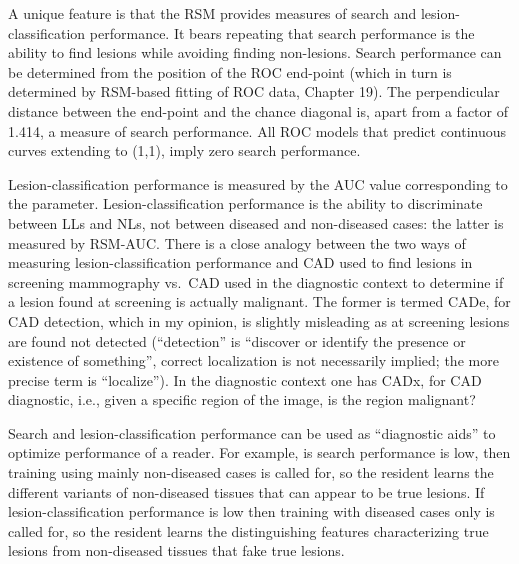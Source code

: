 \documentclass[
]{book}
\begin{document}
A unique feature is that the RSM provides measures of search and lesion-classification performance. It bears repeating that search performance is the ability to find lesions while avoiding finding non-lesions. Search performance can be determined from the position of the ROC end-point (which in turn is determined by RSM-based fitting of ROC data, Chapter 19). The perpendicular distance between the end-point and the chance diagonal is, apart from a factor of 1.414, a measure of search performance. All ROC models that predict continuous curves extending to (1,1), imply zero search performance.

Lesion-classification performance is measured by the AUC value corresponding to the parameter. Lesion-classification performance is the ability to discriminate between LLs and NLs, not between diseased and non-diseased cases: the latter is measured by RSM-AUC. There is a close analogy between the two ways of measuring lesion-classification performance and CAD used to find lesions in screening mammography vs.~CAD used in the diagnostic context to determine if a lesion found at screening is actually malignant. The former is termed CADe, for CAD detection, which in my opinion, is slightly misleading as at screening lesions are found not detected (``detection'' is ``discover or identify the presence or existence of something'', correct localization is not necessarily implied; the more precise term is ``localize''). In the diagnostic context one has CADx, for CAD diagnostic, i.e., given a specific region of the image, is the region malignant?

Search and lesion-classification performance can be used as ``diagnostic aids'' to optimize performance of a reader. For example, is search performance is low, then training using mainly non-diseased cases is called for, so the resident learns the different variants of non-diseased tissues that can appear to be true lesions. If lesion-classification performance is low then training with diseased cases only is called for, so the resident learns the distinguishing features characterizing true lesions from non-diseased tissues that fake true lesions.
\end{document}
